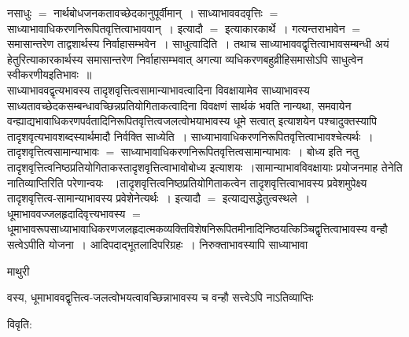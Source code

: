 \documentclass[10pt, openany]{book}
\begin{document}
{नसाधुः $=$ नार्थबोधजनकतावच्छेदकानुपूर्वीमान्~। साध्याभाववदवृत्तिः $=$ साध्याभावाधिकरणनिरूपितवृत्तित्वाभाववान्~। इत्यादौ $=$ इत्याकारकार्थे~। गत्यन्तराभावेन $=$ समासान्तरेण ताद्वशार्थस्य निर्वाहासम्भवेन~। {\la साधुत्वादिति~।} तथाच \textendash साध्याभाववद्वृत्तित्वाभावसम्बन्धी अयं हेतुरित्याकारकार्थस्य समासान्तरेण निर्वाहासम्भवात् अगत्या व्यधिकरणबहुव्रीहिसमासोऽपि साधुत्वेन स्वीकरणीयइतिभावः~॥\\

साध्याभाववद्वृत्यभावस्य तादृशवृत्तित्वसामान्याभावत्वादिना विवक्षायामेव साध्याभावस्य साध्यतावच्छेदकसम्बन्धावच्छिन्नप्रतियोगिताकत्वादिना विवक्षणं सार्थकं भवति नान्यथा, समवायेन वन्ह्याद्यभावाधिकरणपर्वतादिनिरूपितवृत्तित्वजलत्वोभयाभावस्य धूमे सत्वात् इत्याशयेन पश्चादुक्तस्यापि तादृशवृत्यभावशब्दस्यार्थमादौ निर्वक्ति {\la साध्येति~।} साध्याभावाधिकरणनिरूपितवृत्तित्वाभावश्चेत्यर्थः~। तादृशवृत्तित्वसामान्याभावः $=$ साध्याभावाधिकरणनिरूपितवृत्तित्वसामान्याभावः~। बोध्य इति नतु
तादृशवृत्तित्वनिष्ठप्रतियोगिताकस्तादृशवृत्तित्वाभावोबोध्य इत्याशयः~।सामान्याभावविवक्षायाः प्रयोजनमाह तेनेति नातिव्याप्तिरिति परेणान्वयः~ ।तादृशवृत्तित्वनिष्ठप्रतियोगिताकत्वेन तादृशवृत्तित्वाभावस्य प्रवेशमुपेक्ष्य तादृशवृत्तित्व-सामान्याभावस्य प्रवेशेनेत्यर्थः~। इत्यादौ $=$ इत्याद्यसद्धेतुत्वस्थले~। धूमाभाववज्जलहृदादिवृत्त्यभावस्य $=$ धूमाभावरूपसाध्याभावाधिकरणजलहृदात्मकव्यक्तिविशेषनिरूपितमीनादिनिष्ठयत्किञ्चिद्वृत्तित्वाभावस्य वन्हौ सत्वेऽपीति योजना~। आदिपदाद्भूतलादिपरिग्रहः~। निरुक्ताभावस्यापि साध्याभावा
\newpage
\begin{center}  माथुरी  \end{center}
{\la वस्य, धूमाभाववद्वृत्तित्व-जलत्वोभयत्वावच्छिन्नाभावस्य च वन्हौ सत्त्वेऽपि नाऽतिव्याप्तिः}
\begin{center}
विवृति:    
\end{center}

}
\end{document}
